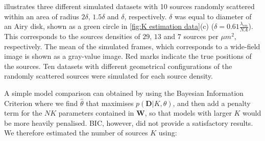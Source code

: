  illustrates three different simulated datasets with 10 sources randomly scattered within an area of radius $2\delta$, $1.5\delta$ and $\delta$, respectively. $\delta$ was equal to diameter of an Airy disk, shown as a green circle in \autoref{fig:K estimation data}(c) ($\delta=0.61\frac{\lambda_{em}}{NA}$). This corresponds to the sources densities of $29$, $13$ and $7$ sources per $\unit{\mu m^{2}}$, respectively. The mean of the simulated frames, which corresponds to a wide-field image is shown as a gray-value image. Red marks indicate the true positions of the sources. Ten datasets with different geometrical configurations of the randomly scattered sources were simulated for each source density. 

A simple model comparison can obtained by using the Bayesian Information Criterion \cite{Bishop2006} where we find $\hat{\theta}$ that maximises $p(\bm{D}|K, \theta)$, and then add a penalty term for the $NK$ parameters contained in $\bm{W}$, so that models with larger $K$ would be more heavily penalised. BIC, however, did not provide a satisfactory results. We therefore estimated the number of sources $K$ using:

